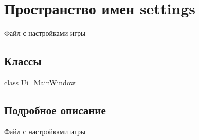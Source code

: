 \hypertarget{namespacesettings}{}\section{Пространство имен settings}
\label{namespacesettings}


Файл с настройками игры  


\subsection*{Классы}
\begin{DoxyCompactItemize}
\item 
class \mbox{\hyperlink{classsettings_1_1_ui___main_window}{Ui\+\_\+\+Main\+Window}}
\end{DoxyCompactItemize}


\subsection{Подробное описание}
Файл с настройками игры 